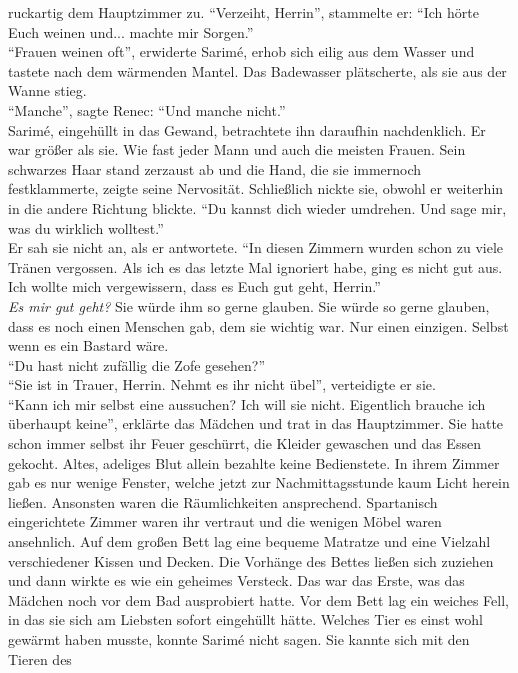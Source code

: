 ruckartig dem Hauptzimmer zu. ``Verzeiht, Herrin'', stammelte er: ``Ich hörte Euch weinen und... 
machte mir Sorgen.''\\
``Frauen weinen oft'', erwiderte Sarimé, erhob sich eilig aus dem Wasser und tastete nach dem 
wärmenden Mantel. Das Badewasser plätscherte, als sie aus der Wanne stieg.\\
``Manche'', sagte Renec: ``Und manche nicht.''\\
Sarimé, eingehüllt in das Gewand, betrachtete ihn daraufhin nachdenklich. Er war größer 
als sie. Wie fast jeder Mann und auch die meisten Frauen. Sein schwarzes Haar stand 
zerzaust ab und die Hand, die sie immernoch festklammerte, zeigte seine Nervosität. Schließlich 
nickte sie, obwohl er weiterhin in die andere Richtung blickte. ``Du kannst dich wieder umdrehen. 
Und sage mir, was du wirklich wolltest.''\\
Er sah sie nicht an, als er antwortete. ``In diesen Zimmern wurden schon zu viele Tränen vergossen. 
Als ich es das letzte Mal ignoriert habe, ging es nicht gut aus. Ich wollte mich vergewissern, dass 
es Euch gut geht, Herrin.''\\
\textit{Es mir gut geht?} Sie würde ihm so gerne glauben. Sie würde so gerne glauben, dass es noch 
einen Menschen gab, dem sie wichtig war. Nur einen einzigen. Selbst wenn es ein Bastard wäre.\\
``Du hast nicht zufällig die Zofe gesehen?''\\
``Sie ist in Trauer, Herrin. Nehmt es ihr nicht übel'', verteidigte er sie.\\
``Kann ich mir selbst eine aussuchen? Ich will sie nicht. Eigentlich brauche ich überhaupt keine'', 
erklärte das Mädchen und trat in das Hauptzimmer. Sie hatte schon immer selbst ihr Feuer geschürrt, 
die Kleider gewaschen und das Essen gekocht. Altes, adeliges Blut allein bezahlte keine 
Bedienstete. In ihrem Zimmer gab es nur wenige Fenster, welche jetzt zur Nachmittagsstunde kaum 
Licht herein ließen. Ansonsten 
waren die Räumlichkeiten ansprechend. Spartanisch eingerichtete Zimmer waren ihr vertraut und die 
wenigen Möbel waren ansehnlich. Auf dem großen Bett lag eine bequeme Matratze und eine Vielzahl 
verschiedener Kissen und Decken. Die Vorhänge des Bettes ließen sich zuziehen und dann wirkte es wie 
ein geheimes Versteck. Das war das Erste, was das Mädchen noch vor dem Bad ausprobiert hatte. Vor 
dem Bett lag ein weiches Fell, in das sie sich am Liebsten sofort eingehüllt hätte. Welches Tier es 
einst wohl gewärmt haben musste, konnte Sarimé nicht sagen. Sie kannte sich mit den Tieren des 
